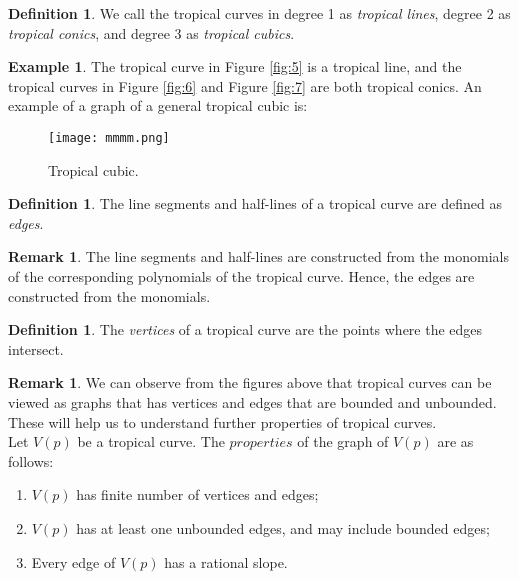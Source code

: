 \documentclass[]{article}
\theoremstyle{definition}
\numberwithin{equation}{section}
\newtheorem{defn}[thm]{Definition}
\newtheorem{examp}[thm]{Example}
\newtheorem{rmk}[thm]{Remark}
\renewcommand{\.}{\,.}
\begin{document}
\begin{defn}
	We call the tropical curves in degree 1 as \emph{tropical lines}, degree 2 as \emph{tropical conics}, and degree 3 as \emph{tropical cubics}. 
\end{defn}
\begin{examp}
	The tropical curve in Figure \ref{fig:5}  is a tropical line, and the tropical curves in Figure \ref{fig:6} and Figure \ref{fig:7} are both tropical conics. An example of a graph of a general tropical cubic is:
	\begin{figure}[H]
		\centering
		\texttt{[image: mmmm.png]}
		\caption{Tropical cubic.}
		\label{fig:8} 
	\end{figure}
\end{examp}
\begin{defn}
The line segments and half-lines of a tropical curve are defined as \emph{edges}. 
\end{defn}
\begin{rmk}
	The line segments and half-lines are constructed from the monomials of the corresponding polynomials of the tropical curve. Hence, the edges are constructed from the monomials.
\end{rmk}
\begin{defn}
	The \emph{vertices} of a tropical curve are the points where the edges intersect. 
\end{defn}
\begin{rmk} We can observe from the figures above that tropical curves can be viewed as graphs that has vertices and edges that are bounded and unbounded. These will help us to understand further properties of tropical curves. \\ Let $V(p)$ be a tropical curve. The $properties$ of the graph of $V(p)$ are as follows:
	\begin{enumerate}[noitemsep,topsep=-6pt]
		\item \vspace{0.75mm}
		$V(p)$ has finite number of vertices and edges; \vspace{2mm}
		\item $V(p)$ has at least one unbounded edges, and may include bounded edges; \vspace{2mm}
		\item Every edge of $V(p)$ has a rational slope.
		 
	\end{enumerate}
	\end{rmk}
\end{document}
